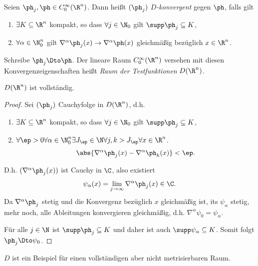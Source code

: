 \begin{defn}
\label{defn:3.2}
Seien $\ph_j,\ph\in C_0^\infty(\R^n)$. Dann heißt $(\ph_j)$
\emph{$D$-konvergent} gegen $\ph$, falls gilt
\begin{enumerate}[label=(\roman{*})]
  \item $\exists K\subseteq \R^n$ kompakt, so dass $\forall j\in\N_0$ gilt
  $\supp \ph_j \subseteq K$,
  \item $\forall \alpha\in\N_0^n$ gilt $\nabla^\alpha \ph_j(x) \to \nabla^\alpha
  \ph(x)$ gleichmäßig bezüglich $x\in\R^n$.
\end{enumerate}
Schreibe $\ph_j \Dto \ph$. Der lineare Raum
$C_0^\infty(\R^n)$ versehen mit diesen Konvergenzeigenschaften heißt \emph{Raum
der Testfunktionen} $D(\R^n)$.\fishhere
\end{defn}

\begin{prop}
\label{prop:3.3}
$D(\R^n)$ ist vollständig.\fishhere
\end{prop}
\begin{proof}
Sei $(\ph_j)$ Cauchyfolge in $D(\R^n)$, d.h.
\begin{enumerate}[label=(\roman{*})]
  \item $\exists K\subseteq \R^n$ kompakt, so dass $\forall j\in\N_0$ gilt
  $\supp \ph_j \subseteq K$,
  \item $\forall \ep > 0 \forall \alpha\in\N_0^n\exists J_\ep \in\N \forall j,k
  > J_\ep\forall x\in\R^n$.
\begin{align*}
\abs{\nabla^\alpha \ph_j(x) - \nabla^\alpha \ph_k(x)} <\ep.
\end{align*}
\end{enumerate}
D.h. $(\nabla^\alpha \ph_j(x))$ ist Cauchy in $\C$, also existiert
\begin{align*}
\psi_\alpha(x) = \lim\limits_{j\to\infty} \nabla^\alpha \ph_j(x) \in \C.
\end{align*}
Da $\nabla^\alpha \ph_j$ stetig und die Konvergenz bezüglich $x$ gleichmäßig
ist, its $\psi_\alpha$ stetig, mehr noch, alle Ableitungen konvergieren
gleichmäßig, d.h. $\nabla^\alpha \psi_0 = \psi_\alpha$.

Für alle $j\in\N$ ist $\supp\ph_j\subseteq K$ und daher ist auch
$\supp\psi_\alpha\subseteq K$. Somit folgt $\ph_j \Dto \psi_0$.\qedhere
\end{proof}

$D$ ist ein Beispiel für einen vollständigen aber nicht metrisierbaren Raum.

